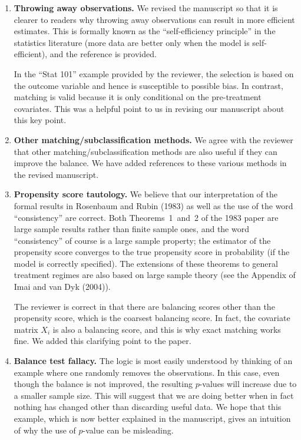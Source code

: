 \documentclass[11pt]{article}
\begin{document}
\begin{enumerate}
  
\item {\bf Throwing away observations.} We revised the manuscript so
  that it is clearer to readers why throwing away observations can
  result in more efficient estimates. This is formally known as the
  ``self-efficiency principle'' in the statistics literature (more
  data are better only when the model is self-efficient), and the
  reference is provided.
  
  In the ``Stat 101'' example provided by the reviewer, the selection
  is based on the outcome variable and hence is susceptible to
  possible bias. In contrast, matching is valid because it is only
  conditional on the pre-treatment covariates.  This was a helpful
  point to us in revising our manuscript about this key point.

\item {\bf Other matching/subclassification methods.} We agree with
  the reviewer that other matching/subclassification methods are also
  useful if they can improve the balance. We have added references to
  these various methods in the revised manuscript.
  
\item {\bf Propensity score tautology.} We believe that our
  interpretation of the formal results in Rosenbaum and Rubin (1983)
  as well as the use of the word ``consistency'' are correct. Both
  Theorems~1~and~2 of the 1983 paper are large sample results rather
  than finite sample ones, and the word ``consistency'' of course is a
  large sample property; the estimator of the propensity score
  converges to the true propensity score in probability (if the model
  is correctly specified).  The extensions of these theorems to
  general treatment regimes are also based on large sample theory (see
  the Appendix of Imai and van Dyk (2004)).
  
  The reviewer is correct in that there are balancing scores other
  than the propensity score, which is the coarsest balancing score. In
  fact, the covariate matrix $X_i$ is also a balancing score, and this
  is why exact matching works fine.  We added this clarifying point to
  the paper.
  
\item {\bf Balance test fallacy.} The logic is most easily understood
  by thinking of an example where one randomly removes the
  observations. In this case, even though the balance is not improved,
  the resulting $p$-values will increase due to a smaller sample size.
  This will suggest that we are doing better when in fact nothing has
  changed other than discarding useful data.  We hope that this
  example, which is now better explained in the manuscript, gives an
  intuition of why the use of $p$-value can be misleading.

\end{enumerate}
\end{document}
